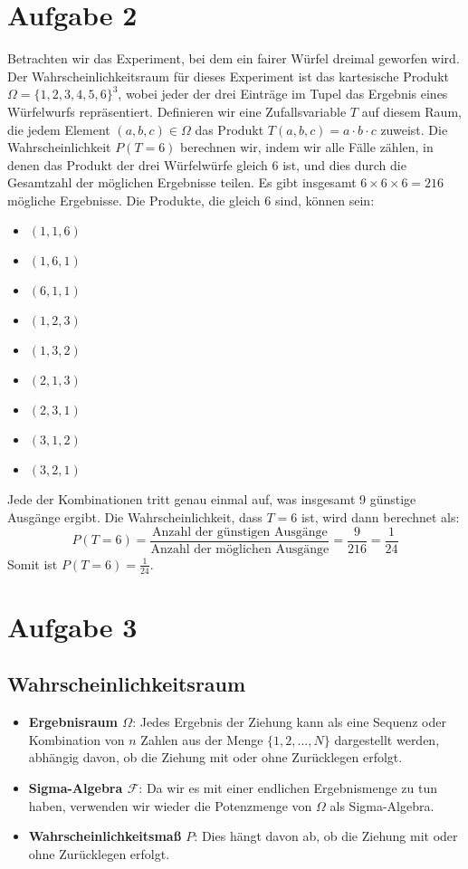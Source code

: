 \documentclass[a4paper]{scrartcl}
\begin{document}
\section*{Aufgabe 2}
Betrachten wir das Experiment, bei dem ein fairer Würfel dreimal geworfen wird. 
Der Wahrscheinlichkeitsraum für dieses Experiment ist das kartesische Produkt \(\Omega = \{1, 2, 3, 4, 5, 6\}^3\), wobei jeder der drei Einträge im Tupel das Ergebnis eines Würfelwurfs repräsentiert.
Definieren wir eine Zufallsvariable \( T \) auf diesem Raum, die jedem Element \( (a, b, c) \in \Omega \) das Produkt \( T(a, b, c) = a \cdot b \cdot c \) zuweist.
Die Wahrscheinlichkeit \( P(T = 6) \) berechnen wir, indem wir alle Fälle zählen, in denen das Produkt der drei Würfelwürfe gleich 6 ist, und dies durch die Gesamtzahl der möglichen Ergebnisse teilen. Es gibt insgesamt \( 6 \times 6 \times 6 = 216 \) mögliche Ergebnisse.
Die Produkte, die gleich 6 sind, können sein:
\begin{itemize}
    \item \( (1, 1, 6) \)
    \item \( (1, 6, 1) \)
    \item \( (6, 1, 1) \)
    \item \( (1, 2, 3) \)
    \item \( (1, 3, 2) \)
    \item \( (2, 1, 3) \)
    \item \( (2, 3, 1) \)
    \item \( (3, 1, 2) \)
    \item \( (3, 2, 1) \)
\end{itemize}
Jede der Kombinationen tritt genau einmal auf, was insgesamt 9 günstige Ausgänge ergibt.
Die Wahrscheinlichkeit, dass \( T = 6 \) ist, wird dann berechnet als:
\[
P(T = 6) = \frac{\text{Anzahl der günstigen Ausgänge}}{\text{Anzahl der möglichen Ausgänge}} = \frac{9}{216} = \frac{1}{24}
\]
Somit ist \( P(T = 6) = \frac{1}{24} \).

\section*{Aufgabe 3}
\subsection*{Wahrscheinlichkeitsraum}
\begin{itemize}
\item \textbf{Ergebnisraum \(\Omega\)}: Jedes Ergebnis der Ziehung kann als eine Sequenz oder Kombination von \(n\) Zahlen aus der Menge \(\{1, 2, ..., N\}\) dargestellt werden, abhängig davon, ob die Ziehung mit oder ohne Zurücklegen erfolgt.
\item \textbf{Sigma-Algebra \(\mathcal{F}\)}: Da wir es mit einer endlichen Ergebnismenge zu tun haben, verwenden wir wieder die Potenzmenge von \(\Omega\) als Sigma-Algebra.
\item \textbf{Wahrscheinlichkeitsmaß \(P\)}: Dies hängt davon ab, ob die Ziehung mit oder ohne Zurücklegen erfolgt.
\end{itemize}
\end{document}
